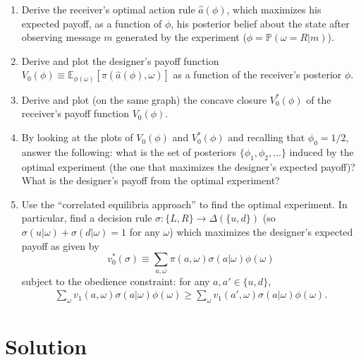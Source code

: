 \documentclass[a4paper]{article}
\newif\ifsolutions
\begin{document}
	\begin{enumerate}
		\item Derive the receiver's optimal action rule $\hat{a}(\phi)$, which maximizes his expected payoff, as a function of $\phi$, his posterior belief about the state after observing message $m$ generated by the experiment ($\phi = \mathbb{P} (\omega=R | m)$).
		\item Derive and plot the designer's payoff function $V_0(\phi) \equiv \mathbb{E}_{\phi(\omega)} \left[\pi (\hat{a}(\phi), \omega)\right]$ as a function of the receiver's posterior $\phi$.
		\item Derive and plot (on the same graph) the concave closure $V_0^* (\phi)$ of the receiver's payoff function $V_0(\phi)$.
		\item By looking at the plots of $V_0(\phi)$ and $V_0^* (\phi)$ and recalling that $\phi_0 = 1/2$, answer the following: what is the set of posteriors $\{\phi_1, \phi_2, ...\}$ induced by the optimal experiment (the one that maximizes the designer's expected payoff)? What is the designer's payoff from the optimal experiment?
		\item Use the ``correlated equilibria approach'' to find the optimal experiment. In particular, find a decision rule $\sigma: \{L,R\} \to \varDelta(\{u,d\})$ (so $\sigma(u|\omega)+\sigma(d|\omega)=1$ for any $\omega$) which maximizes the designer's expected payoff as given by
		\begin{equation*}
			v_0^* (\sigma) \equiv  \sum_{a,\omega} \pi(a,\omega) \sigma (a | \omega) \phi(\omega)
		\end{equation*}
		subject to the obedience constraint: for any $a,a' \in \{u,d\}$,
		\begin{align*}
			\sum_{\omega} v_1 (a, \omega) \sigma (a | \omega) \phi(\omega) 
			\geq \sum_{\omega} v_1 (a', \omega) \sigma (a | \omega) \phi(\omega) .
		\end{align*} 
	\end{enumerate}
	
	
\ifsolutions
\section*{Solution}
\end{document}
